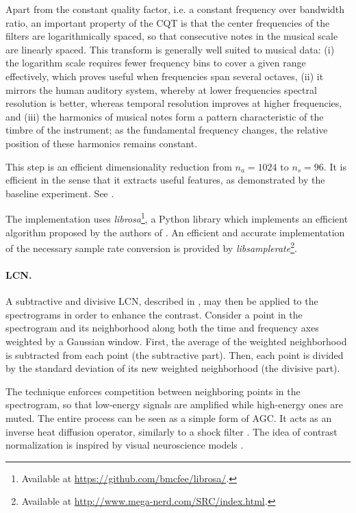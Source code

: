 Apart from the constant quality factor, i.e. a constant frequency over bandwidth ratio, an important property of the \gls{CQT} is that the center frequencies of the filters are logarithmically spaced, so that consecutive notes in the musical scale are linearly spaced.
This transform is generally well suited to musical data: (i) the logarithm scale requires fewer frequency bins to cover a given range effectively, which proves useful when frequencies span several octaves, (ii) it mirrors the human auditory system, whereby at lower frequencies spectral resolution is better, whereas temporal resolution improves at higher frequencies, and (iii) the harmonics of musical notes form a pattern characteristic of the timbre of the instrument; as the fundamental frequency changes, the relative position of these harmonics remains constant.

This step is an efficient dimensionality reduction from $n_a = 1024$ to $n_s = 96$. It is efficient in the sense that it extracts useful features, as demonstrated by the baseline experiment. See .

The implementation uses \textit{librosa}\footnote{Available at \url{https://github.com/bmcfee/librosa/}.}, a Python library which implements an efficient algorithm proposed by the authors of \cite{schorkhuber2010CQTtoolbox}. An efficient and accurate implementation of the necessary sample rate conversion is provided by \textit{libsamplerate}\footnote{Available at \url{http://www.mega-nerd.com/SRC/index.html}.}.

\paragraph{\gls{LCN}.}
A subtractive and divisive \gls{LCN}, described in \cite{lecun2010LCN}, may then be applied to the spectrograms in order to enhance the contrast.
Consider a point in the spectrogram and its neighborhood along both the time and frequency axes weighted by a Gaussian window. First, the average of the weighted neighborhood is subtracted from each point (the subtractive part). Then, each point is divided by the standard deviation of its new weighted neighborhood (the divisive part).

The technique enforces competition between neighboring points in the spectrogram, so that low-energy signals are amplified while high-energy ones are muted. The entire process can be seen as a simple form of \gls{AGC}. It acts as an inverse heat diffusion operator, similarly to a shock filter \cite{osher1990shockFilters}. The idea of contrast normalization is inspired by visual neuroscience models \cite{lyu2008LCNneuro1, pinto2008LCNneuro2}.

